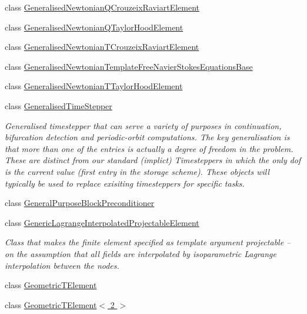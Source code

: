 \begin{DoxyCompactItemize}
class \hyperlink{classoomph_1_1GeneralisedNewtonianQCrouzeixRaviartElement}{Generalised\+Newtonian\+Q\+Crouzeix\+Raviart\+Element}
\item 
class \hyperlink{classoomph_1_1GeneralisedNewtonianQTaylorHoodElement}{Generalised\+Newtonian\+Q\+Taylor\+Hood\+Element}
\item 
class \hyperlink{classoomph_1_1GeneralisedNewtonianTCrouzeixRaviartElement}{Generalised\+Newtonian\+T\+Crouzeix\+Raviart\+Element}
\item 
class \hyperlink{classoomph_1_1GeneralisedNewtonianTemplateFreeNavierStokesEquationsBase}{Generalised\+Newtonian\+Template\+Free\+Navier\+Stokes\+Equations\+Base}
\item 
class \hyperlink{classoomph_1_1GeneralisedNewtonianTTaylorHoodElement}{Generalised\+Newtonian\+T\+Taylor\+Hood\+Element}
\item 
class \hyperlink{classoomph_1_1GeneralisedTimeStepper}{Generalised\+Time\+Stepper}
\begin{DoxyCompactList}\small\item\em Generalised timestepper that can serve a variety of purposes in continuation, bifurcation detection and periodic-\/orbit computations. The key generalisation is that more than one of the entries is actually a degree of freedom in the problem. These are distinct from our standard (implict) Timesteppers in which the only dof is the current value (first entry in the storage scheme). These objects will typically be used to replace exisiting timesteppers for specific tasks. \end{DoxyCompactList}\item 
class \hyperlink{classoomph_1_1GeneralPurposeBlockPreconditioner}{General\+Purpose\+Block\+Preconditioner}
\item 
class \hyperlink{classoomph_1_1GenericLagrangeInterpolatedProjectableElement}{Generic\+Lagrange\+Interpolated\+Projectable\+Element}
\begin{DoxyCompactList}\small\item\em Class that makes the finite element specified as template argument projectable -- on the assumption that all fields are interpolated by isoparametric Lagrange interpolation between the nodes. \end{DoxyCompactList}\item 
class \hyperlink{classoomph_1_1GeometricTElement}{Geometric\+T\+Element}
\item 
class \hyperlink{classoomph_1_1GeometricTElement_3_012_01_4}{Geometric\+T\+Element$<$ 2 $>$}

\end{DoxyCompactItemize}
